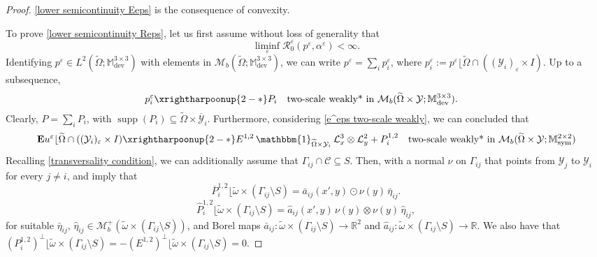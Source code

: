 \documentclass[reqno,10pt]{amsart}
\numberwithin{equation}{section}
\theoremstyle{remark}
\newcommand{\calC}{\mathcal{C}}
\newcommand{\calL}{\mathcal{L}}
\newcommand{\M}{\mathbb{M}}
\newcommand{\R}{\mathbb{R}}
\newcommand{\calR}{\mathcal{R}}
\newcommand{\calY}{\mathcal{Y}}
\DeclareMathOperator{\dev}{dev}
\DeclareMathOperator{\sym}{sym}
\DeclareMathOperator{\supp}{supp}
\newcommand{\closure}[1]{\overline{#1}}
\newcommand{\weakstartwoscale}{\xrightharpoonup{2-*}}
\newcommand{\eps}{\varepsilon}
\newcommand{\zerothI}[1]{\overline{#1}}
\newcommand{\firstI}[1]{\widehat{#1}}
\newcommand{\Mb}{\mathcal{M}_b}
\newcommand{\mres}[1]{\lfloor{#1}}
\newcommand{\charfun}[1]{\mathbbm{1}_{#1}}
\newcommand{\ext}[1]{\widetilde{#1}}
\newcommand{\E}{{\bf E}}
\begin{document}
\begin{proof}
\eqref{lower semicontinuity Eeps} is the consequence of convexity. 

To prove \eqref{lower semicontinuity Reps}, let us first assume without loss of generality that 
\begin{equation} \label{WLOG finite liminf}
	\liminf\limits_{\eps} \calR^{\eps}_{0}(p^\eps, \alpha^\eps) < \infty.
\end{equation}
Identifying $p^\eps \in L^2(\ext{\Omega};\M^{3 \times 3}_{\dev})$ with elements in $\Mb(\ext{\Omega};\M^{3 \times 3}_{\dev})$, 
we can write
$p^\eps = \sum_{i} p^\eps_{i}$,
where $p^\eps_{i} := p^\eps\mres{\ext{\Omega} \cap ((\calY_i)_\eps \times I)}$. %
Up to a subsequence,
\begin{align*}
	& p^\eps_{i} \weakstartwoscale P_{i} \quad \text{two-scale weakly* in $\Mb(\ext{\Omega} \times \calY;\M^{3 \times 3}_{\dev})$}. 
\end{align*}
Clearly, 
$P = \sum_{i} P_{i}$,
with $\supp(P_{i}) \subseteq \ext{\Omega} \times \closure{\calY}_i$. %
Furthermore, considering \eqref{e^eps two-scale weakly}, we can concluded that
\begin{equation*}
	{\E}u^\eps\mres{\ext{\Omega} \cap ((\calY_i)_\eps \times I)} \weakstartwoscale E^{1,2} \,\charfun{\ext{\Omega} \times \calY_i} \,\calL^{3}_{x} \otimes \calL^{2}_{y} + P_{i}^{1,2} \quad \text{two-scale weakly* in $\Mb(\ext{\Omega} \times \calY;\M^{2 \times 2}_{\sym})$}
\end{equation*}
Recalling \eqref{transversality condition}, we can additionally assume that $\Gamma_{ij} \cap \calC \subseteq S$. 
Then, with a normal $\nu$ on $\Gamma_{ij}$ that points from $\calY_j$ to $\calY_i$ for every $j \neq i$,  and  imply that
\begin{equation} \label{rank-1 lemma implication 0th moment}
	\zerothI{P}_{i}^{1,2}\mres{\ext{\omega} \times (\Gamma_{ij} \setminus S)} = \bar{a}_{ij}(x',y) \odot \nu(y) \,\bar{\eta}_{ij}.
\end{equation}
\begin{equation} \label{rank-1 lemma implication 1st moment}
	\firstI{P}_{i}^{1,2}\mres{\ext{\omega} \times (\Gamma_{ij} \setminus S)} = \hat{a}_{ij}(x',y)\, \nu(y) \otimes \nu(y) \,\hat{\eta}_{ij},
\end{equation}
for suitable $\bar{\eta}_{ij},\, \hat{\eta}_{ij} \in \Mb^+ (\ext{\omega} \times (\Gamma_{ij} \setminus S))$, 
and Borel maps $\bar{a}_{ij} : \ext{\omega} \times (\Gamma_{ij} \setminus S) \to \R^2$ and $\hat{a}_{ij} : \ext{\omega} \times (\Gamma_{ij} \setminus S) \to \R$. We also have that $(P_i^{1,2})^{\perp}\mres{\ext{\omega} \times (\Gamma_{ij} \setminus S)}=-(E^{1,2})^{\perp} \mres{\ext{\omega} \times (\Gamma_{ij} \setminus S)}=0$. 


\end{proof}
\end{document}
